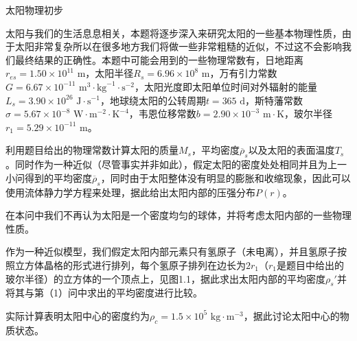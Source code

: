 \documentclass[exam]{cphos}
\begin{document}
\begin{problem}[40]{太阳物理初步}

\begin{problemstatement}
太阳与我们的生活息息相关，本题将逐步深入来研究太阳的一些基本物理性质，由于太阳非常复杂所以在很多地方我们将做一些非常粗糙的近似，不过这不会影响我们最终结果的正确性。本题中可能会用到的一些物理常数有，日地距离$r_{es}=1.50\times 10^{11}\text{~m}$，太阳半径$R_s=6.96\times 10^{8}\text{~m}$，万有引力常数$G=6.67\times 10^{-11}\text{~m}^3\cdot\text{kg}^{-1}\cdot\text{s}^{-2}$，太阳光度即太阳单位时间对外辐射的能量$L_s=3.90\times 10^{26}\text{~J}\cdot\text{s}^{-1}$，地球绕太阳的公转周期$t=365\text{~d}$，斯特藩常数$\sigma=5.67\times 10^{-8}\text{~W}\cdot\text{m}^{-2}\cdot\text{K}^{-4}$，韦恩位移常数$b=2.90\times 10^{-3}\text{~m}\cdot\text{K}$，玻尔半径$r_1=5.29\times 10^{-11}\text{~m}$。

利用题目给出的物理常数计算太阳的质量$M_s$，平均密度$\overline{\rho}_s$以及太阳的表面温度$T_s$。同时作为一种近似（尽管事实并非如此），假定太阳的密度处处相同并且为上一小问得到的平均密度$\overline{\rho}_s$，同时由于太阳整体没有明显的膨胀和收缩现象，因此可以使用流体静力学方程来处理，据此给出太阳内部的压强分布$P(r)$。

在本问中我们不再认为太阳是一个密度均匀的球体，并将考虑太阳内部的一些物理性质。

作为一种近似模型，我们假定太阳内部元素只有氢原子（未电离），并且氢原子按照立方体晶格的形式进行排列，每个氢原子排列在边长为$2r_1$（$r_1$是题目中给出的玻尔半径）的立方体的一个顶点上，见图1.1，据此求出太阳内部的平均密度$\rho_s'$并将其与第（1）问中求出的平均密度进行比较。

实际计算表明太阳中心的密度约为$\rho_c=1.5\times 10^5\text{~kg}\cdot\text{m}^{-3}$，据此讨论太阳中心的物质状态。
\end{problemstatement}

\begin{solution}


\end{solution}
\end{problem}
\end{document}
